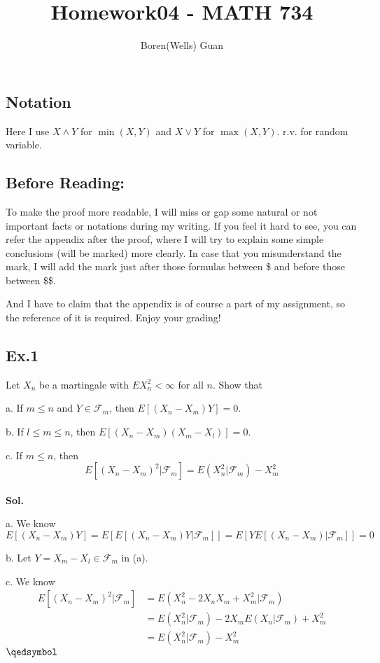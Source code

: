 \documentclass[lang=en,11pt,a4paper,citestyle =authoryear]{elegantpaper}
\title{Homework04 - MATH 734}
\author{Boren(Wells) Guan}
\newcommand{\prvd}{$\hfill \qedsymbol$}
\newcommand{\F}{\mathcal{F}}
\begin{document}
\maketitle

\subsection*{Notation}
Here I use $X \wedge Y$ for $\min(X,Y)$ and $X\vee Y$ for $\max(X,Y)$. r.v. for random variable.

\subsection*{Before Reading:}\par
To make the proof more readable, I will miss or gap some natural or not important facts or notations during my writing. If you feel it hard to see, you can refer the appendix after the proof, where I will try to explain some simple conclusions (will be marked) more clearly. In case that you misunderstand the mark, I will add the mark just after those formulas between \$ and before those between \$\$.\par
And I have to claim that the appendix is of course a part of my assignment, so the reference of it is required. Enjoy your grading!

\subsection*{Ex.1} 
Let $X_n$ be a martingale with $EX_n^2 < \infty$ for all $n$. Show that\par
a. If $m\leq n$ and $Y\in\F_m$, then $E[(X_n-X_m)Y] = 0$.\par
b. If $l\leq m \leq n$, then $E[(X_n-X_m)(X_m-X_l)] = 0$.\par
c. If $m\leq n$, then
\[E[(X_n-X_m)^2|\F_m] = E(X_n^2|\F_m) - X_m^2\]
\vspace{0.5em}\\
\textbf{Sol.} \par
a. We know
\[E[(X_n-X_m)Y] = E[E[(X_n-X_m)Y|\F_m]] = E[YE[(X_n-X_m)|\F_m]] = 0\]\par
b. Let $Y = X_m - X_l \in \F_m$ in (a).\par
c. We know
\[
\begin{aligned}
E[(X_n-X_m)^2|\F_m] &= E(X_n^2-2X_nX_m+X_m^2|\F_m) \\ &= E(X_n^2|\F_m) - 2X_mE(X_n|\F_m)+X_m^2 \\ &= E(X_n^2|\F_m) - X_m^2
\end{aligned}
\]
\prvd
\vspace{0.5em}
\end{document}
